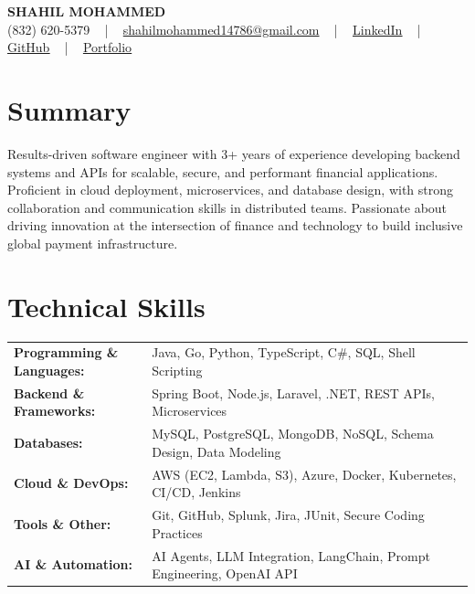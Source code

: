 \documentclass[letterpaper,11pt]{article}
\begin{document}
\begin{center}
    {\fontsize{14pt}{12pt}\selectfont \textbf{\MakeUppercase{Shahil Mohammed}}}\\ \vspace{2pt}
    \fontsize{10pt}{12pt}\selectfont (832) 620-5379 ~ | ~ \href{mailto:shahilmohammed14786@gmail.com}{shahilmohammed14786@gmail.com} ~ | ~  
    \href{https://www.linkedin.com/in/shahil-mohammed-9652931a1/}{\color{blue}\underline{LinkedIn}}  ~ | ~ 
    \href{https://github.com/freakbeast14}{\color{blue}\underline{GitHub}} ~ | ~ 
    \href{https://shahil-mohammed.netlify.app/}{\color{blue}\underline{Portfolio}}
    \vspace{-8pt}
\end{center}

\section{Summary}
\fontsize{9pt}{10pt}\selectfont
Results-driven software engineer with 3+ years of experience developing backend systems and APIs for scalable, secure, and performant financial applications. Proficient in cloud deployment, microservices, and database design, with strong collaboration and communication skills in distributed teams. Passionate about driving innovation at the intersection of finance and technology to build inclusive global payment infrastructure.
 \vspace{-5pt}
 
\section{Technical Skills}
        \vspace{-14pt}
        \begin{table}[h]
            \fontsize{9pt}{10pt}\selectfont
            \begin{tabular}{p{0.3\linewidth} p{0.7\linewidth}}
                \textbf{Programming \& Languages:} & Java, Go, Python, TypeScript, C\#, SQL, Shell Scripting \\
                \textbf{Backend \& Frameworks:} & Spring Boot, Node.js, Laravel, .NET, REST APIs, Microservices \\
                \textbf{Databases:} & MySQL, PostgreSQL, MongoDB, NoSQL, Schema Design, Data Modeling \\
                \textbf{Cloud \& DevOps:} & AWS (EC2, Lambda, S3), Azure, Docker, Kubernetes, CI/CD, Jenkins \\
                \textbf{Tools \& Other:} & Git, GitHub, Splunk, Jira, JUnit, Secure Coding Practices \\
                \textbf{AI \& Automation:} & AI Agents, LLM Integration, LangChain, Prompt Engineering, OpenAI API \\
            \end{tabular}
        \end{table}
 \vspace{-15pt}
 
\end{document}
